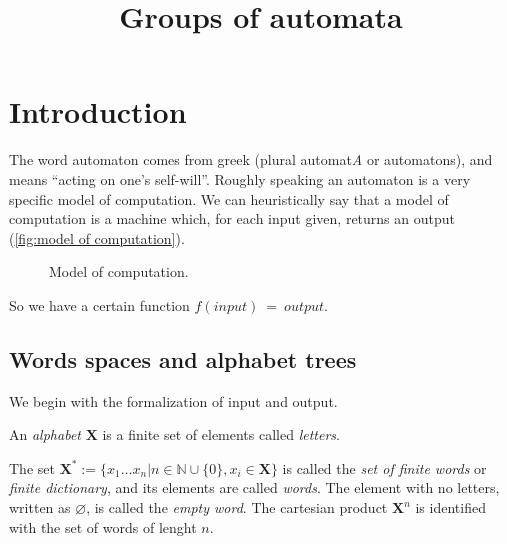 \documentclass[mat1]{fmfdeloTS2.0}
\title{Groups of automata} %
\newcommand{\N}{\mathbb N}
\newcommand{\obs}{}				%
\newcommand{\abece}{\mathbf{X}}			%
\newcommand{\fslovar}{\mathbf{X^*}}		%
\begin{document}

\tableofcontents


\section{Introduction}

The word \obs{automaton} comes from greek (plural \obs{automat\emph{A}} or \obs{automatons}), and means ``acting on one's self-will''. Roughly speaking an automaton is a very specific \obs{model of computation}. We can heuristically say that a model of computation is a machine which, for each input given, returns an output (\autoref{fig:model of computation}).
\begin{figure}[!h]
\caption{Model of computation.}
\label{fig:model of computation}
\end{figure}

So we have a certain function $f(input)\:=\:output$.


\subsection{Words spaces and alphabet trees}
We begin with the formalization of input and output.

\begin{definition}
An \emph{alphabet} $\abece$ is a finite set of elements called \emph{letters}.
\end{definition}

\begin{definition}
The set $\fslovar:=\{x_1\dots x_n|n\in\N\cup\{0\}, x_i\in\abece \}$ is called the \emph{set of finite words} or \emph{finite dictionary}, and its elements are called \emph{words}.  The element with no letters, written as $\varnothing$, is called the \emph{empty word}. The cartesian product $\abece^n$ is identified with the set of words of lenght $n$.
\end{definition}
\end{document}
